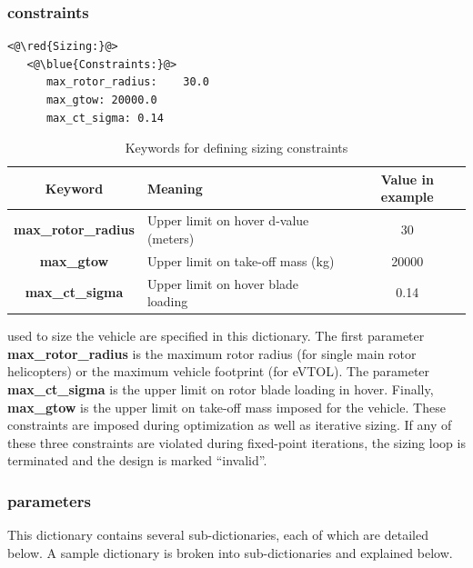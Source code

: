 \subsubsection{ constraints}
\vspace{-0.5cm}
\begin{lstlisting}
<@\red{Sizing:}@>
   <@\blue{Constraints:}@>
      max_rotor_radius:    30.0 
      max_gtow: 20000.0
      max_ct_sigma: 0.14
\end{lstlisting}

\begin{center}
  \begin{table}[H]
	\caption{Keywords for defining sizing constraints}
	\label{tbl:constraint_keywords}
    \begin{tabular}{| c | l | c |}
    \hline
    Keyword & Meaning & Value in example \\ 
    \hline
\textbf{max\_rotor\_radius} & Upper limit on hover d-value (meters) & 30  \\
\textbf{max\_gtow} & Upper limit on take-off mass  (kg) & 20000 \\
\textbf{max\_ct\_sigma} & Upper limit on hover blade loading & 0.14 \\
     \hline
  \end{tabular}
\end{table}
\end{center}
\vspace{-1cm}
 used to size the vehicle are specified in this dictionary. The first parameter \textbf{max\_rotor\_radius} is the maximum rotor radius (for single main rotor helicopters) or the maximum vehicle footprint (for eVTOL). The parameter \textbf{max\_ct\_sigma} is the upper limit on rotor blade loading in hover. Finally, \textbf{max\_gtow} is the upper limit on take-off mass imposed for the vehicle. These constraints are imposed during optimization as well as iterative sizing. If any of these three constraints are violated during fixed-point iterations, the sizing loop is terminated and the design is marked ``invalid''.

\subsubsection{ parameters}
This dictionary contains several sub-dictionaries, each of which are detailed below. A sample dictionary is broken into sub-dictionaries and explained below.

